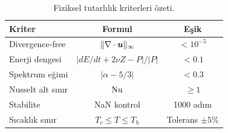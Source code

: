 \begin{table}[H]
\centering
\caption{Fiziksel tutarlılık kriterleri özeti.}
\label{tab:consistency_criteria}
\begin{tabular}{lcc}
\toprule
\textbf{Kriter} & \textbf{Formul} & \textbf{Eşik} \\
\midrule
Divergence-free       & $\| \nabla \cdot \bm{u} \|_\infty$ & $< 10^{-5}$ \\
Enerji dengesi        & $|dE/dt + 2\nu Z - P| / |P|$       & $< 0.1$ \\
Spektrum eğimi    & $|\alpha - 5/3|$                     & $< 0.3$ \\
Nusselt alt sınır & $\mathrm{Nu}$                              & $\geq 1$ \\
Stabilite             & NaN kontrol                          & 1000 adım \\
Sıcaklık sınır & $T_c \leq T \leq T_h$          & Tolerans $\pm 5\%$ \\
\bottomrule
\end{tabular}
\end{table}
